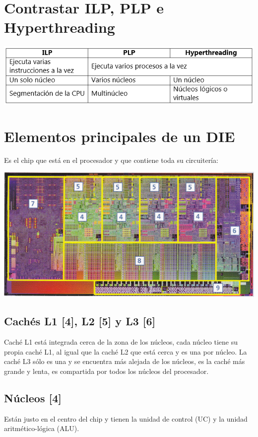 \documentclass[11pt,letterpaper]{article}
\begin{document}
\section{Contrastar ILP, PLP e Hyperthreading}
\begin{center}
	\includegraphics[scale=0.9]{ILPPLPHY.png}
\end{center}

\section{Elementos principales de un DIE}
\noindent
Es el chip que está en el procesador y que contiene toda su circuitería:
\begin{center}
	\includegraphics[scale=0.7]{DIE.png}
\end{center}
\subsection{Cachés L1 [4], L2 [5] y L3 [6]}
\noindent
Caché L1 está integrada cerca de la zona de los núcleos, cada núcleo tiene su propia caché L1, al igual que la caché L2 que está cerca y es una por núcleo.
La caché L3 sólo es una y se encuentra más alejada de los núcleos, es la caché más grande y lenta, es compartida por todos los núcleos del procesador.
\subsection{Núcleos [4]}
\noindent
Están justo en el centro del chip y tienen la unidad de control (UC) y la unidad aritmético-lógica (ALU).
\end{document}
